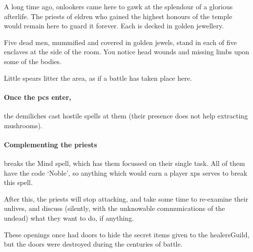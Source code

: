 A long time ago, onlookers came here to gawk at the splendour of a glorious afterlife.
The priests of \gls{eldren} who gained the highest honours of the temple would remain here to guard it forever.
Each is decked in golden jewellery.

\begin{boxtext}

  Five dead men, mummified and covered in golden jewels, stand in each of five enclaves at the side of the room.
  You notice head wounds and missing limbs upon some of the bodies.

  Little spears litter the area, as if a battle has taken place here.

\end{boxtext}




\paragraph{Once the \glspl{pc} enter,}
the demiliches cast hostile spells at them (their presence does not help extracting mushrooms).

\paragraph{Complementing the priests}
breaks the Mind spell, which has them focussed on their single task.
All of them have the code `Noble', so anything which would earn a player \glspl{xp} serves to break this spell.%

After this, the priests will stop attacking, and take some time to re-examine their unlives, and discuss (silently, with the unknowable communications of the undead) what they want to do, if anything.


\begin{exampletext}
  These openings once had doors to hide the secret items given to the \gls{healersGuild}, but the doors were destroyed during the centuries of battle.
\end{exampletext}

